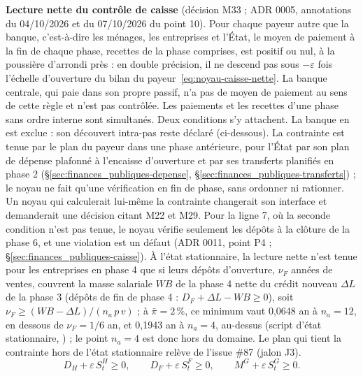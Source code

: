 \documentclass[11pt,a4paper]{article}
\newcommand{\code}[1]{\texttt{\detokenize{#1}}}
\begin{document}
\textbf{Lecture nette du contrôle de caisse} (décision M33 ; ADR 0005, annotations du 04/10/2026 et du 07/10/2026 du point 10). Pour chaque payeur autre que la banque, c'est-à-dire les ménages, les entreprises et l'État, le moyen de paiement à la fin de chaque phase, recettes de la phase comprises, est positif ou nul, à la poussière d'arrondi près : en double précision, il ne descend pas sous $-\varepsilon$ fois l'échelle d'ouverture du bilan du payeur~\eqref{eq:noyau-caisse-nette}. La banque centrale, qui paie dans son propre passif, n'a pas de moyen de paiement au sens de cette règle et n'est pas contrôlée. Les paiements et les recettes d'une phase sans ordre interne sont simultanés. Deux conditions s'y attachent. La banque en est exclue : son découvert intra-pas reste déclaré (ci-dessous). La contrainte est tenue par le plan du payeur dans une phase antérieure, pour l'État par son plan de dépense plafonné à l'encaisse d'ouverture et par ses transferts planifiés en phase 2 (\S\ref{sec:finances_publiques-depense}, \S\ref{sec:finances_publiques-transferts}) ; le noyau ne fait qu'une vérification en fin de phase, sans ordonner ni rationner. Un noyau qui calculerait lui-même la contrainte changerait son interface et demanderait une décision citant M22 et M29. Pour la ligne 7, où la seconde condition n'est pas tenue, le noyau vérifie seulement les dépôts à la clôture de la phase 6, et une violation est un défaut (ADR 0011, point P4 ; \S\ref{sec:finances_publiques-caisse}). À l'état stationnaire, la lecture nette n'est tenue pour les entreprises en phase 4 que si leurs dépôts d'ouverture, $\nu_F$ années de ventes, couvrent la masse salariale $\mathit{WB}$ de la phase 4 nette du crédit nouveau $\Delta L$ de la phase 3 (dépôts de fin de phase 4 : $D_F + \Delta L - \mathit{WB} \ge 0$), soit $\nu_F \ge (\mathit{WB} - \Delta L)/(n_a\,p\,v)$ ; à $\bar\pi = 2\,\%$, ce minimum vaut 0,0648 an à $n_a = 12$, en dessous de $\nu_F = 1/6$ an, et 0,1943 an à $n_a = 4$, au-dessus (script d'état stationnaire, \code{outils/etat_stationnaire.py}) ; le point $n_a = 4$ est donc hors du domaine. Le plan qui tient la contrainte hors de l'état stationnaire relève de l'issue \#87 (jalon J3).
\begin{equation}\label{eq:noyau-caisse-nette}
D_H + \varepsilon\,S^H_t \ge 0, \qquad D_F + \varepsilon\,S^F_t \ge 0, \qquad M^G + \varepsilon\,S^G_t \ge 0 .
\end{equation}
\end{document}
